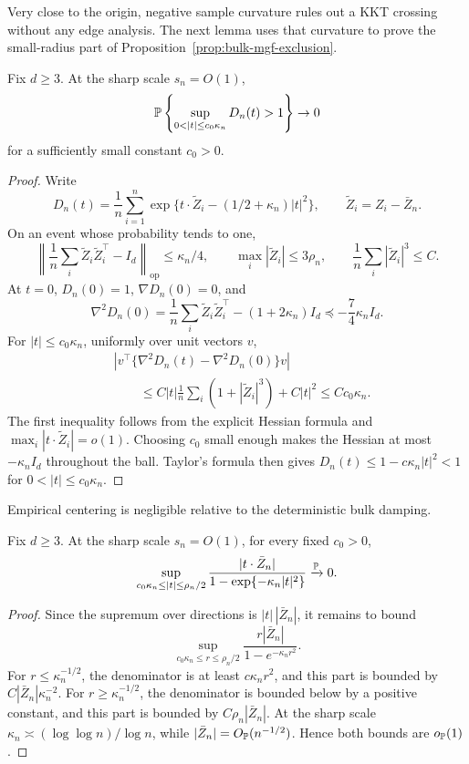 Very close to the origin, negative sample curvature rules out a KKT crossing
without any edge analysis. The next lemma uses that curvature to prove the
small-radius part of Proposition~\ref{prop:bulk-mgf-exclusion}.
\begin{lemma}
\label{lem:microscopic-bulk}
Fix \(d\ge3\). At the sharp scale \(s_n=O(1)\),
\[
    \Pbb\left\{\sup_{0<|t|\le c_0\kappa_n}D_n(t)>1\right\}\to0
\]
for a sufficiently small constant \(c_0>0\).
\end{lemma}

\begin{proof}
Write
\[
    D_n(t)=\frac1n\sum_{i=1}^n
    \exp\{t\cdot \widetilde Z_i-(1/2+\kappa_n)|t|^2\},
    \qquad \widetilde Z_i=Z_i-\bar Z_n .
\]
On an event whose probability tends to one,
\[
    \left\|\frac1n\sum_i\widetilde Z_i\widetilde Z_i^\top-I_d\right\|_{\mathrm{op}}
    \le \kappa_n/4,\qquad
    \max_i|\widetilde Z_i|\le3\rho_n,\qquad
    \frac1n\sum_i|\widetilde Z_i|^3\le C .
\]
At \(t=0\), \(D_n(0)=1\), \(\nabla D_n(0)=0\), and
\[
    \nabla^2D_n(0)
    =
    \frac1n\sum_i\widetilde Z_i\widetilde Z_i^\top-(1+2\kappa_n)I_d
    \preceq-\frac74\kappa_nI_d .
\]
For \(|t|\le c_0\kappa_n\), uniformly over unit vectors \(v\),
\[
\begin{aligned}
    &\left|
    v^\top\{\nabla^2D_n(t)-\nabla^2D_n(0)\}v
    \right|  \\
    &\qquad\le
    C|t|\frac1n\sum_i(1+|\widetilde Z_i|^3)+C|t|^2
    \le Cc_0\kappa_n .
\end{aligned}
\]
The first inequality follows from the explicit Hessian formula and
\(\max_i|t\cdot \widetilde Z_i|=o(1)\).  Choosing \(c_0\) small enough makes the
Hessian at most \(-\kappa_n I_d\) throughout the ball.  Taylor's formula
then gives \(D_n(t)\le1-c\kappa_n|t|^2<1\) for \(0<|t|\le c_0\kappa_n\).
\end{proof}

Empirical centering is negligible relative to the deterministic bulk damping.
\begin{lemma}
\label{lem:bulk-empirical-centering}
Fix \(d\ge3\). At the sharp scale \(s_n=O(1)\), for every fixed \(c_0>0\),
\[
    \sup_{c_0\kappa_n\le |t|\le\rho_n/2}
    \frac{|t\cdot\bar Z_n|}
         {1-\exp\{-\kappa_n|t|^2\}}
    \xrightarrow{\mathbb P}0 .
\]
\end{lemma}

\begin{proof}
Since the supremum over directions is \(|t|\,|\bar Z_n|\), it remains to
bound
\[
    \sup_{c_0\kappa_n\le r\le\rho_n/2}
    \frac{r|\bar Z_n|}{1-e^{-\kappa_nr^2}} .
\]
For \(r\le\kappa_n^{-1/2}\), the denominator is at least
\(c\kappa_nr^2\), and this part is bounded by
\(C|\bar Z_n|\kappa_n^{-2}\).  For \(r\ge\kappa_n^{-1/2}\), the
denominator is bounded below by a positive constant, and this part is
bounded by \(C\rho_n|\bar Z_n|\).  At the sharp scale
\(\kappa_n\asymp(\log\log n)/\log n\), while
\(|\bar Z_n|=O_{\mathbb P}(n^{-1/2})\).  Hence both bounds are
\(o_{\mathbb P}(1)\).
\end{proof}

